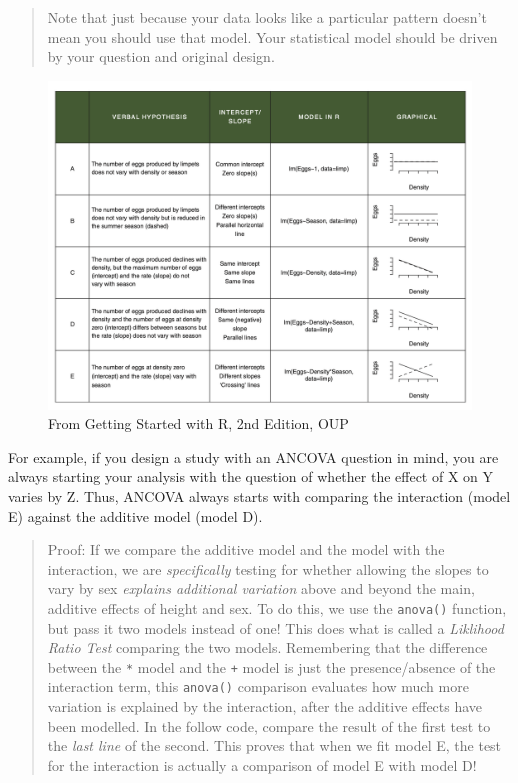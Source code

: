 \documentclass[
]{book}
\begin{document}
\begin{quote}
Note that just because your data looks like a particular pattern doesn't mean you should use that model. Your statistical model should be driven by your question and original design.
\end{quote}

\begin{figure}
\includegraphics[width=20.56in]{images/GSwithR_Grid} \caption{From Getting Started with R, 2nd Edition, OUP}\label{fig:unnamed-chunk-50}
\end{figure}

For example, if you design a study with an ANCOVA question in mind, you are always starting your analysis with the question of whether the effect of X on Y varies by Z. Thus, ANCOVA always starts with comparing the interaction (model E) against the additive model (model D).

\begin{quote}
Proof: If we compare the additive model and the model with the interaction, we are \emph{specifically} testing for whether allowing the slopes to vary by sex \emph{explains additional variation} above and beyond the main, additive effects of height and sex. To do this, we use the \texttt{anova()} function, but pass it two models instead of one! This does what is called a \emph{Liklihood Ratio Test} comparing the two models. Remembering that the difference between the \texttt{*} model and the \texttt{+} model is just the presence/absence of the interaction term, this \texttt{anova()} comparison evaluates how much more variation is explained by the interaction, after the additive effects have been modelled. In the follow code, compare the result of the first test to the \emph{last line} of the second. This proves that when we fit model E, the test for the interaction is actually a comparison of model E with model D!
\end{quote}
\end{document}
